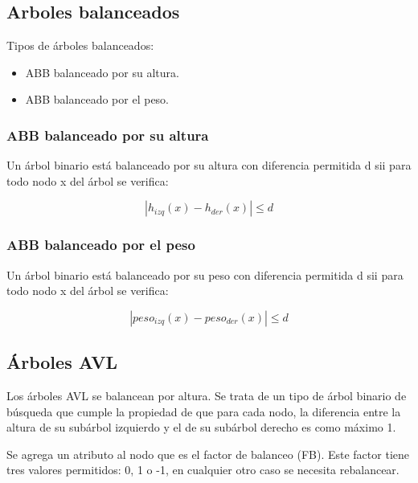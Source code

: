 \documentclass[../main.tex]{subfiles}
\begin{document}
    \subsection{Arboles balanceados}
        Tipos de árboles balanceados:
        \begin{itemize}
            \item ABB balanceado por su altura.
            \item ABB balanceado por el peso.
        \end{itemize}

        \subsubsection{ABB balanceado por su altura}
            Un árbol binario está balanceado por su altura con diferencia permitida d sii para todo nodo x del árbol se verifica:

            \begin{equation}
                |h_{izq}(x) - h_{der}(x)| \leq d
            \end{equation}

        \subsubsection{ABB balanceado por el peso}
            Un árbol binario está balanceado por su peso con diferencia permitida d sii para todo nodo x del árbol se verifica:

            \begin{equation}
                |peso_{izq}(x) - peso_{der}(x)| \leq d
            \end{equation}

    \subsection{Árboles AVL}
        Los árboles AVL se balancean por altura. Se trata de un tipo de árbol binario de búsqueda que cumple la propiedad de que para cada nodo, la diferencia entre la altura de su subárbol izquierdo y el de su subárbol derecho es como máximo 1.
        
        Se agrega un atributo al nodo que es el factor de balanceo (FB). Este factor tiene tres valores permitidos: 0, 1 o -1, en cualquier otro caso se necesita rebalancear.
\end{document}
